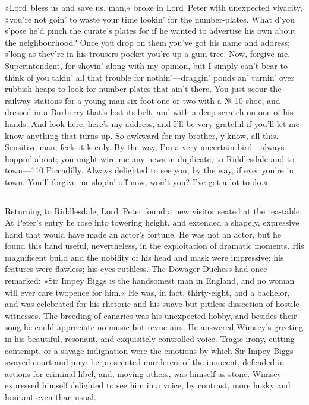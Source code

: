 »Lord~bless us and save us, man,« broke in Lord~Peter with unexpected vivacity, »you're not goin' to waste your time lookin' for the number-plates. What d'you s'pose he'd pinch the curate's plates for if he wanted to advertise his own about the neighbourhood? Once you drop on them you've got his name and address; s'long as they're in his trousers pocket you're up a gum-tree. Now, forgive me, Superintendent, for shovin' along with my opinion, but I simply can't bear to think of you takin' all that trouble for nothin'—draggin' ponds an' turnin' over rubbish-heaps to look for number-plates that ain't there. You just scour the railway-stations for a young man six foot one or two with a № 10 shoe, and dressed in a Burberry that's lost its belt, and with a deep scratch on one of his hands. And look here, here's my address, and I'll be very grateful if you'll let me know anything that turns up. So awkward for my brother, y'know, all this. Sensitive man; feels it keenly. By the way, I'm a very uncertain bird—always hoppin' about; you might wire me any news in duplicate, to Riddlesdale and to town—110 Piccadilly. Always delighted to see you, by the way, if ever you're in town. You'll forgive me slopin' off now, won't you? I've got a lot to do.«

\noindent\hfil\rule{0.5\textwidth}{.4pt}\hfil

Returning to Riddlesdale, Lord~Peter found a new visitor seated at the tea-table. At Peter's entry he rose into towering height, and extended a shapely, expressive hand that would have made an actor's fortune.  He was not an actor, but he found this hand useful, nevertheless, in the exploitation of dramatic moments. His magnificent build and the nobility of his head and mask were impressive; his features were flawless; his eyes ruthless. The Dowager Duchess had once remarked: »Sir Impey Biggs is the handsomest man in England, and no woman will ever care twopence for him.« He was, in fact, thirty-eight, and a bachelor, and was celebrated for his rhetoric and his suave but pitiless dissection of hostile witnesses. The breeding of canaries was his unexpected hobby, and besides their song he could appreciate no music but revue airs. He answered Wimsey's greeting in his beautiful, resonant, and exquisitely controlled voice. Tragic irony, cutting contempt, or a savage indignation were the emotions by which Sir Impey Biggs swayed court and jury; he prosecuted murderers of the innocent, defended in actions for criminal libel, and, moving others, was himself as stone. Wimsey expressed himself delighted to see him in a voice, by contrast, more husky and hesitant even than usual.

